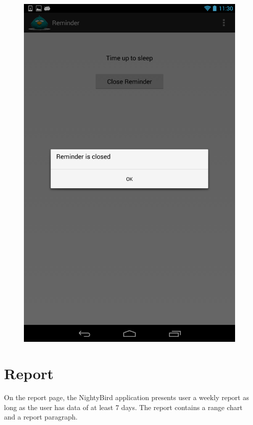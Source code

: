 \documentclass[14pt]{extreport}
\begin{document}
\begin{figure}[h]
\begin{center}
\includegraphics[width=5in]{reminder_closed}
\end{center}
\end{figure}

\chapter{Report}
On the report page, the NightyBird application presents user a weekly report as long as the user has data of at least 7 days. The report contains a range chart and a report paragraph.
\end{document}
